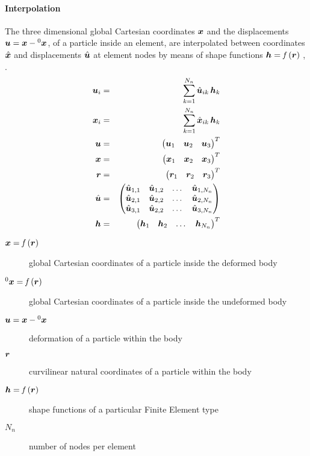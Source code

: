 \paragraph{Interpolation}
The three dimensional global Cartesian coordinates $\bm{x}$ and the displacements $\bm{u}=\bm{x} - {^0}\bm{x}$, of a particle inside an element,
are interpolated between coordinates $\hat{\bm{x}}$ and displacements $\hat{\bm{u}}$ at element nodes by means of shape functions $\bm{h}=\mathit{f}\left(\bm{r}\right)$ \cite{BATHE2016}, \cite{KUEBLER2005}.
\begin{eqnarray}
  \bm{u}_{i} &=& \sum_{k=1}^{N_n}\hat{\bm{u}}_{ik} \,\bm{h}_{k} \label{eq:solid:u:interpol} \\
  \bm{x}_{i} &=& \sum_{k=1}^{N_n}\hat{\bm{x}}_{ik} \,\bm{h}_{k} \\
  \bm{u} &=& \begin{pmatrix} \bm{u}_1 & \bm{u}_2 & \bm{u}_3 \end{pmatrix}^T \\
  \bm{x} &=& \begin{pmatrix} \bm{x}_1 & \bm{x}_2 & \bm{x}_3 \end{pmatrix}^T \\
  \bm{r} &=& \begin{pmatrix} \bm{r}_1 & \bm{r}_2 & \bm{r}_3 \end{pmatrix}^T \\
  \hat{\bm{u}} &=& \begin{pmatrix}
    \hat{\bm{u}}_{1,1} & \hat{\bm{u}}_{1,2} & \ldots{} & \hat{\bm{u}}_{1,N_n} \\
    \hat{\bm{u}}_{2,1} & \hat{\bm{u}}_{2,2} & \ldots{} & \hat{\bm{u}}_{2,N_n} \\
    \hat{\bm{u}}_{3,1} & \hat{\bm{u}}_{2,2} & \ldots{} & \hat{\bm{u}}_{3,N_n}
  \end{pmatrix} \\
  \bm{h} & = & \begin{pmatrix}
    \bm{h}_1 & \bm{h}_2 & \ldots{} & \bm{h}_{N_n}
  \end{pmatrix}^T
\end{eqnarray}

\begin{description}
\item[$\bm{x}=\mathit{f}\left(\bm{r}\right)$] global Cartesian coordinates of a particle inside the deformed body
\item[$^0\bm{x}=\mathit{f}\left(\bm{r}\right)$] global Cartesian coordinates of a particle inside the undeformed body
\item[$\bm{u}=\bm{x}-{^0}\bm{x}$] deformation of a particle within the body
\item[$\bm{r}$] curvilinear natural coordinates of a particle within the body
\item[$\bm{h}=\mathit{f}\left(\bm{r}\right)$] shape functions of a particular Finite Element type
\item[$N_n$] number of nodes per element
\end{description}

